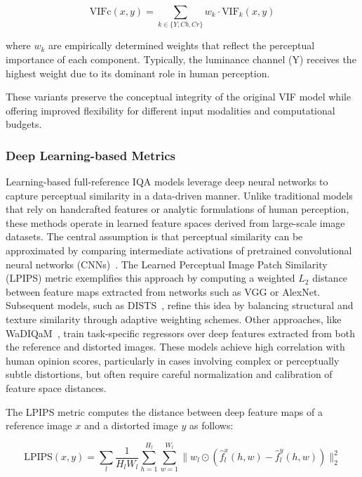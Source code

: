 \begin{equation}
\text{VIFc}(x, y) = \sum_{k \in \{Y,Cb,Cr\}} w_k \cdot \text{VIF}_k(x, y)
\end{equation}

where $w_k$ are empirically determined weights that reflect the perceptual importance of each component. Typically, the luminance channel (Y) receives the highest weight due to its dominant role in human perception.

These variants preserve the conceptual integrity of the original VIF model while offering improved flexibility for different input modalities and computational budgets.

\subsubsection{Deep Learning-based Metrics}\label{sec:deep_learning_based_metrics}

Learning-based full-reference IQA models leverage deep neural networks to capture perceptual similarity in a data-driven manner. Unlike traditional models that rely on handcrafted features or analytic formulations of human perception, these methods operate in learned feature spaces derived from large-scale image datasets. The central assumption is that perceptual similarity can be approximated by comparing intermediate activations of pretrained convolutional neural networks (CNNs)~\cite{Zhang2018LPIPS}. The Learned Perceptual Image Patch Similarity (LPIPS) metric exemplifies this approach by computing a weighted $L_2$ distance between feature maps extracted from networks such as VGG or AlexNet. Subsequent models, such as DISTS~\cite{ding2020dists}, refine this idea by balancing structural and texture similarity through adaptive weighting schemes. Other approaches, like WaDIQaM~\cite{Bosse2018WaDIQaM}, train task-specific regressors over deep features extracted from both the reference and distorted images. These models achieve high correlation with human opinion scores, particularly in cases involving complex or perceptually subtle distortions, but often require careful normalization and calibration of feature space distances.

The LPIPS metric computes the distance between deep feature maps of a reference image $x$ and a distorted image $y$ as follows:

\begin{equation}
\text{LPIPS}(x, y) = \sum_{l} \frac{1}{H_l W_l} \sum_{h=1}^{H_l} \sum_{w=1}^{W_l} \| w_l \odot (\hat{f}_l^x(h, w) - \hat{f}_l^y(h, w)) \|_2^2
\end{equation}


